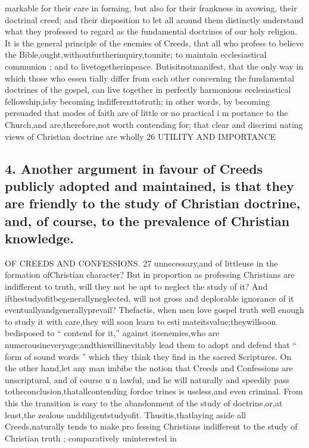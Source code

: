 \documentclass[
]{book}
\begin{document}
markable for their care in forming, but also for their frankness in avowing, their doctrinal creed; and their disposition to let all around
them distinctly understand what they professed to regard as the fundamental doctrines of our holy religion.
It is the general principle of the enemies of Creeds, that all who profess to believe the Bible,ought,withoutfurtherinquiry,tounite;
to maintain ecclesiastical communion ; and to
livetogetherinpeace. Butisitnotmanifest,
that the only way in which those who essen
tially differ from each other concerning the fundamental doctrines of the gospel, can live
together in perfectly harmonious ecclesiastical fellowship,isby becoming indifferenttotruth; in other words, by becoming persuaded that modes of faith are of little or no practical i m portance to the Church,and are,therefore,not
worth contending for; that clear and discrimi nating views of Christian doctrine are wholly
26 UTILITY AND IMPORTANCE

\hypertarget{another-argument-in-favour-of-creeds-publicly-adopted-and-maintained-is-that-they-are-friendly-to-the-study-of-christian-doctrine-and-of-course-to-the-prevalence-of-christian-knowledge.}{%
\subsection{4. Another argument in favour of Creeds publicly adopted and maintained, is that they are friendly to the study of Christian doctrine, and, of course, to the prevalence of Christian knowledge.}\label{another-argument-in-favour-of-creeds-publicly-adopted-and-maintained-is-that-they-are-friendly-to-the-study-of-christian-doctrine-and-of-course-to-the-prevalence-of-christian-knowledge.}}

OF CREEDS AND CONFESSIONS. 27
unnecessary,and of littleuse in the formation ofChristian character? But in proportion as
professing Christians are indifferent to truth, will they not be apt to neglect the study of it? And ifthestudyofitbegenerallyneglected, will not gross and deplorable ignorance of it eventuallyandgenerallyprevail? Thefactis,
when men love gospel truth well enough to study it with care,they will soon learn to esti
mateitsvalue;theywillsoon bedisposed to
`` contend for it,'' against itsenemies,who are
numerousineveryage;andthiswillinevitably
lead them to adopt and defend that `` form of
sound words '' which they think they find in
the sacred Scriptures. On the other hand,let
any man imbibe the notion that Creeds and
Confessions are unscriptural, and of course u n
lawful, and he will naturally and speedily pass
totheconclusion,thatallcontending fordoc trines is useless,and even criminal. From
this the transition is easy to the abandonment of the study of doctrine,or,at least,the zealous
anddiligentstudyofit. Thusitis,thatlaying aside all Creeds,naturally tends to make pro fessing Christians indifferent to the study of Christian truth ; comparatively uninterested in
\end{document}
